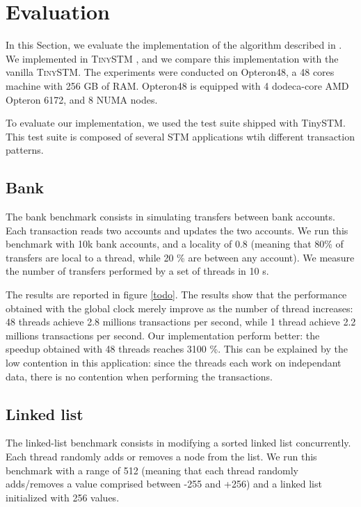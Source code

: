 \section{Evaluation}


In this Section, we evaluate the implementation of the algorithm
described in .  We implemented  in
\textsc{TinySTM} \cite{FelberFMR10}, and we compare this implementation
with the vanilla \textsc{TinySTM}.
%
The experiments were conducted on Opteron48, a 48 cores machine with
256 GB of RAM. Opteron48 is equipped with 4 dodeca-core AMD Opteron
6172, and 8 NUMA nodes.

To evaluate our implementation, we used the test suite shipped with
TinySTM. This test suite is composed of several STM applications wtih
different transaction patterns.

\subsection{Bank}

The bank benchmark consists in simulating transfers between bank
accounts. Each transaction reads two accounts and updates the two
accounts. We run this benchmark with 10k bank accounts, and a locality
of 0.8 (meaning that 80\% of transfers are local to a thread, while 20
\% are between any account). We measure the number of transfers
performed by a set of threads in 10 s.

The results are reported in figure \ref{todo}.
%
The results show that the performance obtained with the global clock
merely improve as the number of thread increases: 48 threads achieve 2.8
millions transactions per second, while 1 thread achieve 2.2 millions
transactions per second.
%
Our implementation perform better: the speedup obtained with 48
threads reaches 3100 \%. This can be explained by the low contention
in this application: since the threads each work on independant data,
there is no contention when performing the transactions.

\subsection{Linked list}

The linked-list benchmark consists in modifying a sorted linked list
concurrently. Each thread randomly adds or removes a node from the
list. We run this benchmark with a range of 512 (meaning that each
thread randomly adds/removes a value comprised between -255 and +256)
and a linked list initialized with 256 values.

